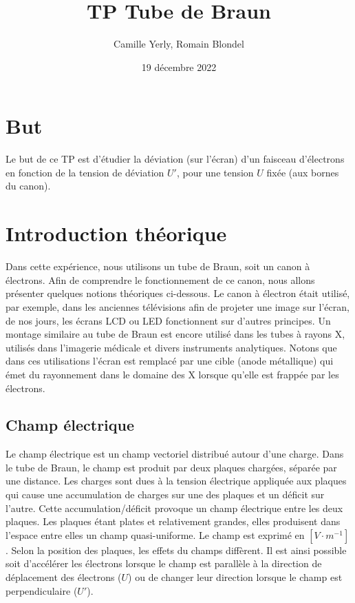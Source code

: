 \documentclass[11pt]{article}
\title{\textbf{TP Tube de Braun}}
\author{Camille Yerly, Romain Blondel}
\affil{2M8, Gymnase Auguste Piccard}
\date{19 décembre 2022}
\begin{document}
\maketitle

\section{But}

Le but de ce TP est d'étudier la déviation (sur l'écran) d'un faisceau d'électrons en fonction de la tension de déviation $U'$, pour une tension $U$ fixée (aux bornes du canon).

\section{Introduction théorique}

Dans cette expérience, nous utilisons un tube de Braun, soit un canon à électrons. Afin de comprendre le fonctionnement de ce canon, nous allons présenter quelques notions théoriques ci-dessous. Le canon à électron était utilisé, par exemple, dans les anciennes télévisions afin de projeter une image sur l'écran, de nos jours, les écrans LCD ou LED fonctionnent sur d'autres principes. Un montage similaire au tube de Braun est encore utilisé dans les tubes à rayons X, utilisés dans l'imagerie médicale et divers instruments analytiques. Notons que dans ces utilisations l'écran est remplacé par une cible (anode métallique) qui émet du rayonnement dans le domaine des X lorsque qu'elle est frappée par les électrons.
\subsection{Champ électrique}
Le champ électrique est un champ vectoriel distribué autour d'une charge. Dans le tube de Braun, le champ est produit par deux plaques chargées, séparée par une distance. Les charges sont dues à la tension électrique appliquée aux plaques qui cause une accumulation de charges sur une des plaques et un déficit sur l'autre. Cette accumulation/déficit provoque un champ électrique entre les deux plaques. Les plaques étant plates et relativement grandes, elles produisent dans l'espace entre elles un champ quasi-uniforme. Le champ est exprimé en $[V\cdot m^{-1}]$. Selon la position des plaques, les effets du champs diffèrent. Il est ainsi possible soit d'accélérer les électrons lorsque le champ est parallèle à la direction de déplacement des électrons ($U$) ou de changer leur direction lorsque le champ est perpendiculaire ($U'$).
\end{document}

